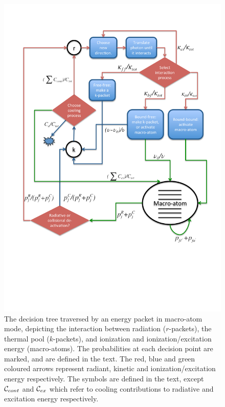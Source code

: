 \begin{figure}
\centering
\includegraphics[width=1.0\textwidth, clip=true, trim=0 2.6in 0in 0in ]{figures/03-radtrans/matom_flow_ca.pdf}
\caption
{
The decision tree traversed by an energy packet 
in macro-atom mode, depicting the interaction
between radiation ($r$-packets), the thermal pool ($k$-packets), and ionization
and ionization/excitation energy (macro-atoms). 
The probabilities at each decision point are 
marked, and are defined in the text. The red, blue and green coloured arrows
represent radiant, kinetic and ionization/excitation energy respectively.
The symbols are defined in the text, except ${\cal C}_{cont}$ and 
${\cal C}_{ex}$ which refer to cooling contributions to radiative and excitation 
energy respectively.
} 
\label{fig:flow_matom}
\end{figure}



